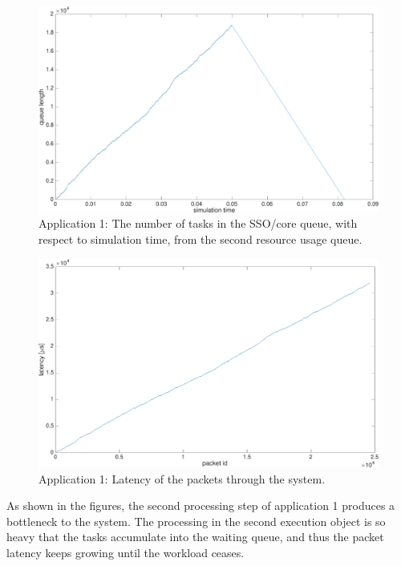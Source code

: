 \begin{figure}[]
  \begin{center}
    \includegraphics[width=\textwidth]{images/experiment/app1-queue2.pdf}
    \caption{Application 1: The number of tasks in the SSO/core queue, with respect to simulation time, from the second resource usage queue.}
    \label{fig:app1-queue2}
  \end{center}
\end{figure}

\begin{figure}[]
  \begin{center}
    \includegraphics[width=\textwidth]{images/experiment/app1-latency.pdf}
    \caption{Application 1: Latency of the packets through the system.}
    \label{fig:app1-latency}
  \end{center}
\end{figure}

As shown in the figures, the second processing step of application 1 produces a bottleneck to the system. The processing in the second execution object is so heavy that the tasks accumulate into the waiting queue, and thus the packet latency keeps growing until the workload ceases.

